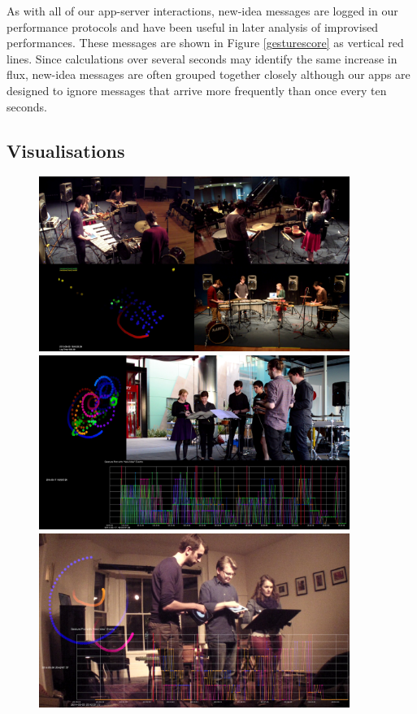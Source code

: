\documentclass[graybox]{svmult}
\begin{document}
As with all of our app-server interactions, new-idea messages are
logged in our performance protocols and have been useful in later
analysis of improvised performances. These messages are shown in
Figure \ref{gesturescore} as vertical red lines. Since calculations
over several seconds may identify the same increase in flux, new-idea
messages are often grouped together closely although our apps are
designed to ignore messages that arrive more frequently than once
every ten seconds. 

\subsection{Visualisations}
\label{subsec:visualisations}


\begin{figure}
  \centering
  \includegraphics[width=0.9\textwidth]{figures/metatone-visualisation-metalonsdale}
  \includegraphics[width=0.9\textwidth]{figures/metatone-visualisation-youarehere}
  \includegraphics[width=0.9\textwidth]{figures/metatone-visualisation-touchandtone}

\end{figure}
\end{document}
